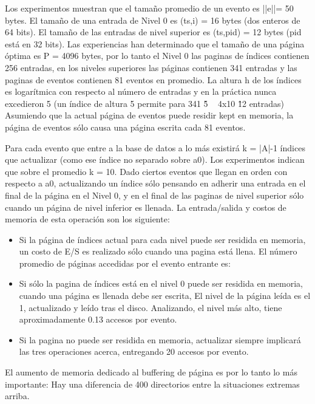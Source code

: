 \documentclass[12pt,a4paper]{report}
\begin{document}
Los experimentos muestran que el tamaño promedio de un evento es ||e||= 50 bytes.  El tamaño de una entrada de Nivel 0 es (ts,i) = 16 bytes (dos enteros de 64 bits).  El tamaño de las entradas de nivel superior es (ts,pid) = 12 bytes (pid está en 32 bits).  Las experiencias han determinado que el tamaño de una página óptima es P = 4096 bytes, por lo tanto el Nivel 0 las paginas de índices contienen 256 entradas, en los niveles superiores las páginas contienen 341 entradas y las paginas de eventos contienen 81 eventos en promedio.  La altura h de los índices es logarítmica con respecto al número de entradas y en la práctica nunca excedieron 5 (un índice de altura 5 permite para 341 \^ 5 ~ 4x10 \^ 12 entradas)  Asumiendo que la actual página de eventos puede residir {kept} en memoria, la página de eventos sólo causa una página escrita cada 81 eventos.

Para cada evento que entre a la base de datos a lo más existirá k = |A|-1 índices que actualizar (como ese índice no separado sobre a0).  Los experimentos indican que sobre el promedio k = 10.  Dado ciertos eventos que llegan en orden con respecto a a0, actualizando un índice sólo pensando en adherir una entrada en el final de la página en el Nivel 0, y en el final de las paginas de nivel superior sólo cuando un página de nivel inferior es llenada.  La entrada/salida y costos de memoria de esta operación son los siguiente:

\begin{itemize}
	\item Si la página de índices actual para cada nivel puede ser residida en memoria, un costo de E/S es realizado sólo cuando una pagina está llena.  El número promedio de páginas accedidas por el evento entrante es:

	\item Si sólo la pagina de índices está en el nivel 0 puede ser residida en memoria, cuando una página es llenada debe ser escrita, El nivel de la página leída es el 1, actualizado y leído tras el disco.  Analizando, el nivel más alto, tiene aproximadamente 0.13 accesos por evento.  

	\item Si la pagina no puede ser residida en memoria, actualizar siempre implicará las tres operaciones acerca, entregando 20 accesos por evento.
\end{itemize}

	El aumento de memoria dedicado al buffering de página es por lo tanto lo más importante:  Hay una diferencia de  400 directorios entre la situaciones extremas arriba.
\end{document}
